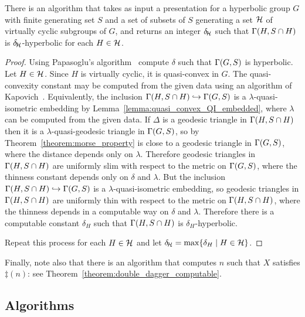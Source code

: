 \begin{proposition}\label{proposition:computing_delta_H}
  There is an algorithm that takes as input a presentation for a hyperbolic group $G$ with finite generating set $S$ and a set of subsets of $S$ generating a set $\mathcal{H}$ of virtually cyclic subgroups of $G$, and returns an integer $\delta\kern-2pt_{\mathcal{H}}$ such that $\operatorname{\Gamma}(H, S \cap H)$ is $\delta\kern-2pt_{\mathcal{H}}$-hyperbolic for each $H \in \mathcal{H}$.
\end{proposition}

\begin{proof}
  Using Papasoglu's algorithm~\cite{papasoglu95} compute $\delta$ such that $\operatorname{\Gamma}(G, S)$ is hyperbolic.
  Let $H \in \mathcal{H}$.
  Since $H$ is virtually cyclic, it is quasi-convex in $G$.
  The quasi-convexity constant may be computed from the given data using an algorithm of Kapovich~\cite[Proposition 4]{kapovich96}.
  Equivalently, the inclusion $\operatorname{\Gamma}(H, S \cap H) \hookrightarrow \operatorname{\Gamma}(G,S)$ is a $\lambda$-quasi-isometric embedding by Lemma~\ref{lemma:quasi_convex_QI_embedded}, where $\lambda$ can be computed from the given data.
  If $\Delta$ is a geodesic triangle in $\operatorname{\Gamma}(H, S \cap H)$ then it is a $\lambda$-quasi-geodesic triangle in $\operatorname{\Gamma}(G, S)$, so by Theorem~\ref{theorem:morse_property} is close to a geodesic triangle in $\operatorname{\Gamma}(G, S)$, where the distance depends only on $\lambda$.
  Therefore geodesic triangles in $\operatorname{\Gamma}(H, S \cap H)$ are uniformly slim with respect to the metric on $\operatorname{\Gamma}(G, S)$, where the thinness constant depends only on $\delta$ and $\lambda$.
  But the inclusion $\operatorname{\Gamma}(H, S \cap H) \hookrightarrow \operatorname{\Gamma}(G, S)$ is a $\lambda$-quasi-isometric embedding, so geodesic triangles in $\operatorname{\Gamma}(H, S \cap H)$ are uniformly thin with respect to the metric on $\operatorname{\Gamma}(H, S \cap H)$, where the thinness depends in a computable way on $\delta$ and $\lambda$.
  Therefore there is a computable constant $\delta_H$ such that $\operatorname{\Gamma}(H, S \cap H)$ is $\delta_H$-hyperbolic.

  Repeat this process for each $H \in \mathcal{H}$ and let $\delta\kern-2pt_{\mathcal{H}} = \max\{\delta_H \mid H \in \mathcal{H}\}$.
\end{proof}

Finally, note also that there is an algorithm that computes $n$ such that $X$ satisfies $\ddag(n)$: see Theorem~\ref{theorem:double_dagger_computable}.

\subsection{Algorithms}

